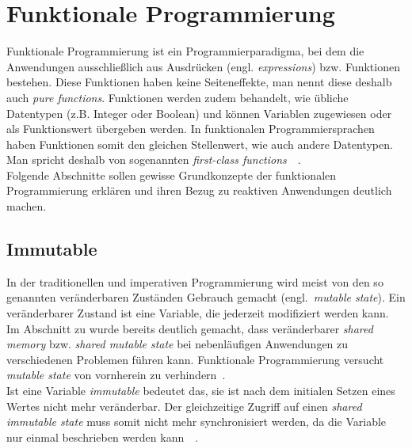 \section{Funktionale Programmierung}
Funktionale Programmierung ist ein Programmierparadigma, bei dem die Anwendungen ausschließlich aus Ausdrücken (engl. \textit{expressions}) bzw. Funktionen bestehen. Diese Funktionen haben keine Seiteneffekte, man nennt diese deshalb auch \textit{pure functions}. Funktionen werden zudem behandelt, wie übliche Datentypen (z.B. Integer oder Boolean) und können Variablen zugewiesen oder als Funktionswert übergeben werden. In funktionalen Programmiersprachen haben Funktionen somit den gleichen Stellenwert, wie auch andere Datentypen. Man spricht deshalb von sogenannten \textit{first-class functions}~\cite[S.~50]{butcher_seven_2014}~\cite[S.~3~\&~S.~19]{chiusano_functional_2015}.\\
Folgende Abschnitte sollen gewisse Grundkonzepte der funktionalen Programmierung erklären und ihren Bezug zu reaktiven Anwendungen deutlich machen. 

\subsection{Immutable}
In der traditionellen und imperativen Programmierung wird meist von den so genannten veränderbaren Zuständen Gebrauch gemacht (engl.~\textit{mutable state}). Ein veränderbarer Zustand ist eine Variable, die jederzeit modifiziert werden kann. Im Abschnitt zu  wurde bereits deutlich gemacht, dass veränderbarer \textit{shared memory} bzw. \textit{shared mutable state} bei nebenläufigen Anwendungen zu verschiedenen Problemen führen kann. Funktionale Programmierung versucht \textit{mutable state} von vornherein zu verhindern~\cite[S.~50]{butcher_seven_2014}.\\
Ist eine Variable \textit{immutable} bedeutet das, sie ist nach dem initialen Setzen eines Wertes nicht mehr veränderbar. Der gleichzeitige Zugriff auf einen \textit{shared immutable state} muss somit nicht mehr synchronisiert werden, da die Variable nur einmal beschrieben werden kann~\cite[S.~50]{butcher_seven_2014}~\cite[S.~62]{kuhn_reactive_2015}.

\pagebreak

